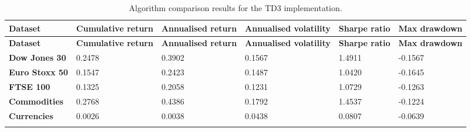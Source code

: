 \begin{longtable}{|l|p{2.1cm}|p{2.1cm}|p{2.1cm}|p{1.5cm}|p{2cm}|}
    \hline
    \textbf{Dataset} & \textbf{Cumulative return} & \textbf{Annualised return} & \textbf{Annualised volatility} & \textbf{Sharpe ratio} & \textbf{Max drawdown}  \\ \midrule
    \endfirsthead

    \hline
    \textbf{Dataset} & \textbf{Cumulative return} & \textbf{Annualised return} & \textbf{Annualised volatility} & \textbf{Sharpe ratio} & \textbf{Max drawdown}  \\ \midrule
    \endhead

    \endfoot
    \hline

    \textbf{Dow Jones 30} & 0.2478 & 0.3902 & 0.1567 & 1.4911 & -0.1567 \\ \hline
    \textbf{Euro Stoxx 50} & 0.1547 & 0.2423 & 0.1487 & 1.0420 & -0.1645 \\ \hline
    \textbf{FTSE 100} & 0.1325 & 0.2058 & 0.1231 & 1.0729 & -0.1263 \\ \hline
    \textbf{Commodities} & 0.2768 & 0.4386 & 0.1792 & 1.4537 & -0.1224 \\ \hline
    \textbf{Currencies} & 0.0026 & 0.0038 & 0.0438 & 0.0807 & -0.0639 \\ \hline

    \caption{Algorithm comparison results for the TD3 implementation.}
    \label{tab:experiment_algorithms_td3}
\end{longtable}